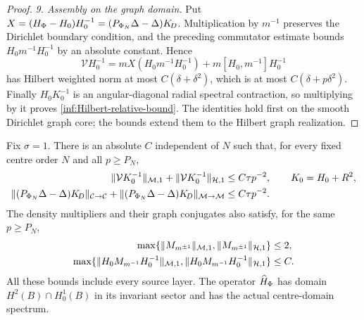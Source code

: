 \begin{proof}
\emph{9. Assembly on the graph domain.}
Put $X=(H_\Phi-H_0)H_0^{-1}
=(P_{\Phi_N}\Delta-\Delta)K_{\!D}$.
Multiplication by $m^{-1}$ preserves the Dirichlet boundary
condition, and the preceding commutator estimate bounds
$H_0m^{-1}H_0^{-1}$ by an absolute constant. Hence
\[
 \mathcal VH_0^{-1}
 =mX(H_0m^{-1}H_0^{-1})+m[H_0,m^{-1}]H_0^{-1}
\]
has Hilbert weighted norm at most $C(\delta+\delta^2)$,
which is at most $C(\delta+p\delta^2)$.
Finally $H_0K_0^{-1}$ is an angular-diagonal radial spectral
contraction, so multiplying by it proves
\eqref{inf:Hilbert-relative-bound}.
The identities hold first on the smooth Dirichlet graph core;
the bounds extend them to the Hilbert graph realization.
\end{proof}

\begin{theorem}\label{inf:relative-graph}
Fix $\sigma=1$. There is an absolute $C$ independent of $N$ such
that, for every fixed centre order $N$ and all $p\ge P_N$,
\begin{align}
 \lVert \mathcal VK_0^{-1}\rVert_{\mathcal M,1}
       +\lVert \mathcal VK_0^{-1}\rVert_{\mathcal{H},1}
 &\le C\tau p^{-2},\qquad K_0=H_0+R^2,
 \label{inf:relative-two-norms}\\
 \lVert (P_{\Phi_N}\Delta-\Delta)K_{\!D}\rVert_{\mathcal C\to\mathcal C}
       +\lVert (P_{\Phi_N}\Delta-\Delta)K_{\!D}\rVert_{\mathcal M\to\mathcal M}
 &\le C\tau p^{-2}.\label{inf:relative-scalar}
\end{align}
The density multipliers and their graph conjugates also satisfy,
for the same $p\ge P_N$,
\begin{align}
 \max\{\lVert M_{m^{\pm1}}\rVert_{\mathcal M,1},
                  \lVert M_{m^{\pm1}}\rVert_{\mathcal{H},1}\}&\le2,\nonumber\\
 \max\{\lVert H_0M_{m^{-1}}H_0^{-1}\rVert_{\mathcal M,1},
                  \lVert H_0M_{m^{-1}}H_0^{-1}\rVert_{\mathcal{H},1}\}&\le C.
 \label{inf:density-graph-bounds}
\end{align}
All these bounds include every source layer. The operator $\widehat H_\Phi$ has domain
$H^2(B)\cap H^1_0(B)$ in its invariant sector and has the actual
centre-domain spectrum.
\end{theorem}
